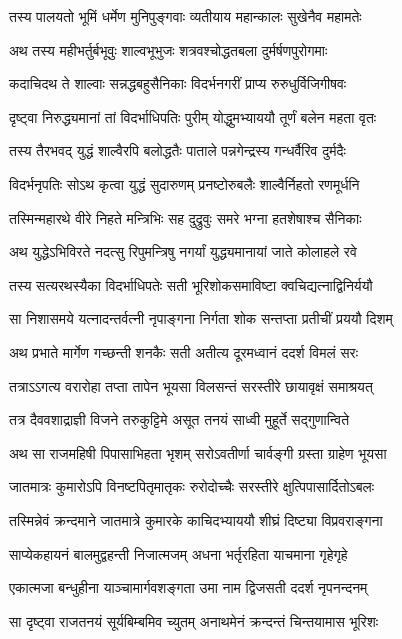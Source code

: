 \begin{center}
\twolineshloka
{तस्य पालयतो भूमिं धर्मेण मुनिपुङ्गवाः}
{व्यतीयाय महान्कालः सुखेनैव महामतेः} %

\twolineshloka
{अथ तस्य महीभर्तुर्बभूवुः शाल्वभूभुजः}
{शत्रवश्चोद्धतबला दुर्मर्षणपुरोगमाः} %

\twolineshloka
{कदाचिदथ ते शाल्वाः सन्नद्धबहुसैनिकाः}
{विदर्भनगरीं प्राप्य रुरुधुर्विजिगीषवः} %

\twolineshloka
{दृष्ट्वा निरुद्ध्यमानां तां विदर्भाधिपतिः पुरीम्}
{योद्धुमभ्याययौ तूर्णं बलेन महता वृतः} %

\twolineshloka
{तस्य तैरभवद् युद्धं शाल्वैरपि बलोद्धतैः}
{पाताले पन्नगेन्द्रस्य गन्धर्वैरिव दुर्मदैः} %

\twolineshloka
{विदर्भनृपतिः सोऽथ कृत्वा युद्धं सुदारुणम्}
{प्रनष्टोरुबलैः शाल्वैर्निहतो रणमूर्धनि} %

\twolineshloka
{तस्मिन्महारथे वीरे निहते मन्त्रिभिः सह}
{दुद्रुवुः समरे भग्ना हतशेषाश्च सैनिकाः} %

\twolineshloka
{अथ युद्धेऽभिविरते नदत्सु रिपुमन्त्रिषु}
{नगर्यां युद्ध्यमानायां जाते कोलाहले रवे} %

\twolineshloka
{तस्य सत्यरथस्यैका विदर्भाधिपतेः सती}
{भूरिशोकसमाविष्टा क्वचिद्यत्नाद्विनिर्ययौ} %

\twolineshloka
{सा निशासमये यत्नादन्तर्वत्नी नृपाङ्गना}
{निर्गता शोक सन्तप्ता प्रतीचीं प्रययौ दिशम्} %

\twolineshloka
{अथ प्रभाते मार्गेण गच्छन्ती शनकैः सती}
{अतीत्य दूरमध्वानं ददर्श विमलं सरः} %

\twolineshloka
{तत्राऽऽगत्य वरारोहा तप्ता तापेन भूयसा}
{विलसन्तं सरस्तीरे छायावृक्षं समाश्रयत्} %

\twolineshloka
{तत्र दैववशाद्राज्ञी विजने तरुकुट्टिमे}
{असूत तनयं साध्वी मुहूर्ते सद्गुणान्विते} %

\twolineshloka
{अथ सा राजमहिषी पिपासाभिहता भृशम्}
{सरोऽवतीर्णा चार्वङ्गी ग्रस्ता ग्राहेण भूयसा} %

\twolineshloka
{जातमात्रः कुमारोऽपि विनष्टपितृमातृकः}
{रुरोदोच्चैः सरस्तीरे क्षुत्पिपासार्दितोऽबलः} %

\twolineshloka
{तस्मिन्नेवं क्रन्दमाने जातमात्रे कुमारके}
{काचिदभ्याययौ शीघ्रं दिष्ट्या विप्रवराङ्गना} %

\twolineshloka
{साप्येकहायनं बालमुद्वहन्ती निजात्मजम्}
{अधना भर्तृरहिता याचमाना गृहेगृहे} %

\twolineshloka
{एकात्मजा बन्धुहीना याञ्चामार्गवशङ्गता}
{उमा नाम द्विजसती ददर्श नृपनन्दनम्} %

\twolineshloka
{सा दृष्ट्वा राजतनयं सूर्यबिम्बमिव च्युतम्}
{अनाथमेनं क्रन्दन्तं चिन्तयामास भूरिशः} %


\end{center}
